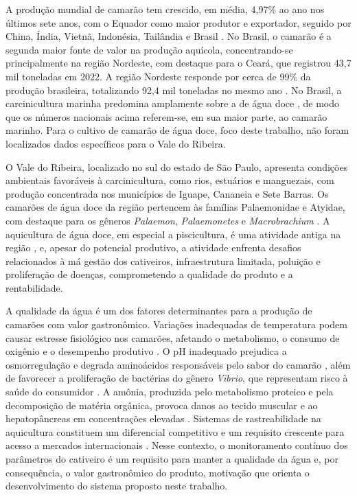 \documentclass[11pt,a4paper]{article}
\begin{document}
A produção mundial de camarão tem crescido, em média, 4,97\% ao ano nos últimos sete anos, com o Equador como maior produtor e exportador, seguido por China, Índia, Vietnã, Indonésia, Tailândia e Brasil \cite{Rocha2023}. No Brasil, o camarão é a segunda maior fonte de valor na produção aquícola, concentrando-se principalmente na região Nordeste, com destaque para o Ceará, que registrou 43,7 mil toneladas em 2022. A região Nordeste responde por cerca de 99\% da produção brasileira, totalizando 92,4 mil toneladas no mesmo ano \cite{Ximenes2023}. No Brasil, a carcinicultura marinha predomina amplamente sobre a de água doce \cite{sebrae2018}, de modo que os números nacionais acima referem-se, em sua maior parte, ao camarão marinho. Para o cultivo de camarão de água doce, foco deste trabalho, não foram localizados dados específicos para o Vale do Ribeira.

O Vale do Ribeira, localizado no sul do estado de São Paulo, apresenta condições ambientais favoráveis à carcinicultura, como rios, estuários e manguezais, com produção concentrada nos municípios de Iguape, Cananeia e Sete Barras. Os camarões de água doce da região pertencem às famílias Palaemonidae e Atyidae, com destaque para os gêneros \textit{Palaemon}, \textit{Palaemonetes} e \textit{Macrobrachium} \cite{bertini2021}. A aquicultura de água doce, em especial a piscicultura, é uma atividade antiga na região \cite{castellani2005}, e, apesar do potencial produtivo, a atividade enfrenta desafios relacionados à má gestão dos cativeiros, infraestrutura limitada, poluição e proliferação de doenças, comprometendo a qualidade do produto e a rentabilidade.

A qualidade da água é um dos fatores determinantes para a produção de camarões com valor gastronômico. Variações inadequadas de temperatura podem causar estresse fisiológico nos camarões, afetando o metabolismo, o consumo de oxigênio e o desempenho produtivo \cite{praciano2018}. O pH inadequado prejudica a osmorregulação e degrada aminoácidos responsáveis pelo sabor do camarão \cite{Hsieh2021}, além de favorecer a proliferação de bactérias do gênero \textit{Vibrio}, que representam risco à saúde do consumidor \cite{han2025}. A amônia, produzida pelo metabolismo proteico e pela decomposição de matéria orgânica, provoca danos ao tecido muscular e ao hepatopâncreas em concentrações elevadas \cite{han2025}. Sistemas de rastreabilidade na aquicultura constituem um diferencial competitivo e um requisito crescente para acesso a mercados internacionais \cite{UniversoSaudeAnimal2025}. Nesse contexto, o monitoramento contínuo dos parâmetros do cativeiro é um requisito para manter a qualidade da água e, por consequência, o valor gastronômico do produto, motivação que orienta o desenvolvimento do sistema proposto neste trabalho.
\end{document}
